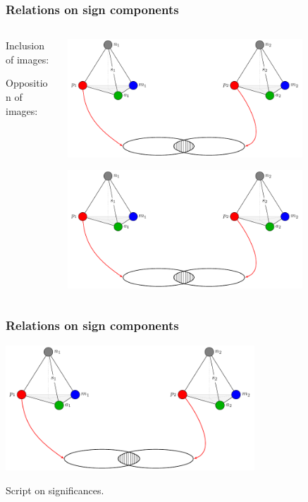\documentclass[default]{beamer}
\begin{document}
	\begin{frame}
		\frametitle{Relations on sign components}
		
		\begin{columns}
			\begin{column}{0.3\textwidth}
				\centering
				Inclusion of images: 
				\par\bigskip
				\par\bigskip
				\par\bigskip
				\par\bigskip
				\par\bigskip
				Opposition of images: 
				
			\end{column}
			\begin{column}{0.7\textwidth}
				\includegraphics[page=2,width=0.8\textwidth]{signs/sign_relations}
				
				\includegraphics[page=3,width=0.8\textwidth]{signs/sign_relations}
			\end{column}
		\end{columns}
		
	\end{frame}	

	\begin{frame}
		\frametitle{Relations on sign components}
		\centering
		\includegraphics[page=4,width=0.7\textwidth]{signs/sign_relations}
		
		Script on significances.
	\end{frame}	
\end{document}
